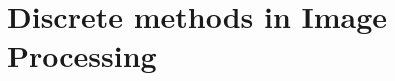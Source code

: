 \chapter{Discrete methods in Image Processing}
\label{chapter:discrete-methods-in-image-processing}

